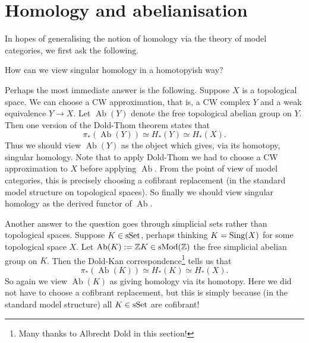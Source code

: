 
\section{Homology and abelianisation}
\label{homology-abelian}

In hopes of generalising the notion of homology via the theory of
model categories, we first ask the following.

\begin{question}
  How can we view singular homology in a homotopyish way?
\end{question}

\renewcommand{\Ab}{\operatorname{Ab}}
\newcommand{\ab}{\mathrm{ab}}

\begin{nothing}
  \label{sing-doldthom}
  Perhaps the most immediate answer is the following. Suppose $X$ is a
  topological space. We can choose a CW approximation, that is, a CW
  complex $Y$ and a weak equivalence $Y \to X$. Let $\Ab(Y)$ denote
  the free topological abelian group on $Y$. Then one version of the
  Dold-Thom theorem \cite{mccord-doldthom} states that
  \[
  \pi_*(\Ab(Y)) \simeq H_*(Y) \simeq H_*(X).
  \]
  Thus we should view $\Ab(Y)$ as the object which gives, via its
  homotopy, singular homology. Note that to apply Dold-Thom we had to
  choose a CW approximation to $X$ before applying $\Ab$. From the
  point of view of model categories, this is precisely choosing a
  cofibrant replacement (in the standard model structure on
  topological spaces). So finally we should view singular homology as
  the derived functor of $\Ab$.
\end{nothing}

\begin{nothing}
  \label{sing-doldkan}
  Another answer to the question goes through simplicial sets rather
  than topological spaces. Suppose $K \in \mathrm{s}\mathrm{Set}$, perhaps thinking $K =
  \operatorname{Sing}(X)$ for some topological space $X$. Let $\Ab(K) \ce \Z
  K\in \s\Mod(\Z)$ the free simplicial abelian group on $K$.  Then the
  Dold-Kan correspondence\footnote{Many thanks to Albrecht Dold in this
    section!} tells us that
  \[
  \pi_*(\Ab(K)) \simeq H_*(K) \simeq H_*(X).
  \]
  So again we view $\Ab(K)$ as giving homology via its homotopy. Here
  we did not have to choose a cofibrant replacement, but this is
  simply because (in the standard model structure) all $K \in \mathrm{s}\mathrm{Set}$
  are cofibrant!
\end{nothing}


